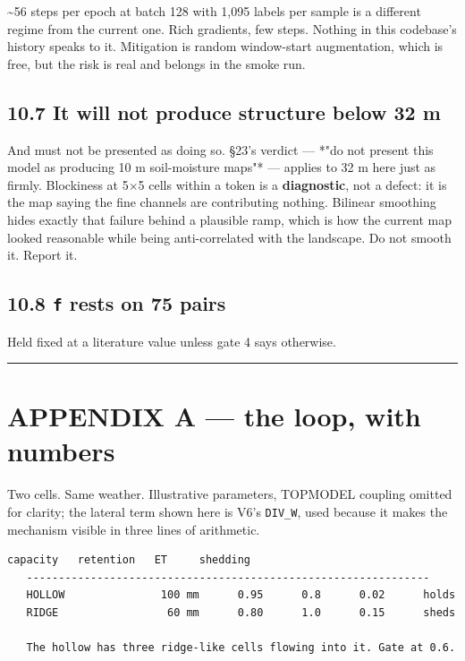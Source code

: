 \documentclass[10pt,a4paper]{article}
\begin{document}
\textasciitilde{}56 steps per epoch at batch 128 with 1,095 labels per sample is a different
regime from the current one. Rich gradients, few steps. Nothing in this
codebase's history speaks to it. Mitigation is random window-start
augmentation, which is free, but the risk is real and belongs in the smoke run.

\subsection*{10.7 It will not produce structure below 32 m}

And must not be presented as doing so. §23's verdict — *"do not present this
model as producing 10 m soil-moisture maps"* — applies to 32 m here just as
firmly. Blockiness at 5×5 cells within a token is a \textbf{diagnostic}, not a
defect: it is the map saying the fine channels are contributing nothing.
Bilinear smoothing hides exactly that failure behind a plausible ramp, which is
how the current map looked reasonable while being anti-correlated with the
landscape. Do not smooth it. Report it.

\subsection*{10.8 \texttt{f} rests on 75 pairs}

Held fixed at a literature value unless gate 4 says otherwise.

\medskip\hrule\medskip

\section*{APPENDIX A — the loop, with numbers}

Two cells. Same weather. Illustrative parameters, TOPMODEL coupling omitted for
clarity; the lateral term shown here is V6's \texttt{DIV\_W}, used because it makes the
mechanism visible in three lines of arithmetic.

\begin{Verbatim}[fontsize=\scriptsize,frame=leftline,framerule=0.6pt,rulecolor=\color{rulegray},xleftmargin=6pt,framesep=6pt,]
                       capacity   retention   ET     shedding
   ---------------------------------------------------------------
   HOLLOW               100 mm      0.95      0.8      0.02      holds
   RIDGE                 60 mm      0.80      1.0      0.15      sheds

   The hollow has three ridge-like cells flowing into it. Gate at 0.6.
\end{Verbatim}
\end{document}
